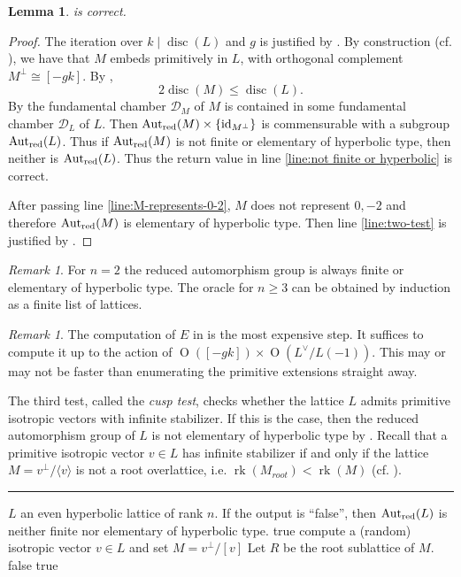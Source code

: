 \documentclass[11pt,letterpaper]{amsart}
\DeclareMathOperator{\rk}{rk}
\DeclareMathOperator{\Aut}{Aut}
\DeclareMathOperator{\id}{id}
\DeclareMathOperator{\disc}{disc}
\DeclareMathOperator{\Or}{O}
\newcommand{\AutredL}{\Aut_{\rm red}(L)}
\newcommand{\AutredM}{\Aut_{\rm red}(M)}
\newcommand{\D}{\mathcal{D}}
\newtheorem{lemma}[theorem]{Lemma}
\theoremstyle{definition}
\theoremstyle{remark}
\newtheorem{remark}[theorem]{Remark}
\begin{document}
\begin{lemma}
 is correct.
\end{lemma}
\begin{proof}
The iteration over $k \mid \disc(L)$ and $g$ is justified by .
By construction (cf. ), we have that $M$ embeds primitively in $L$, with orthogonal complement $M^\perp \cong [-gk]$. By  
,
\[2 \disc(M) \leq \disc(L).\]
By  the fundamental chamber $\D_M$ of $M$ is contained in some fundamental chamber $\D_L$ of $L$. Then $\AutredM\times \{\id_{M^\perp}\}$ is commensurable with a subgroup $\AutredL$. Thus if $\AutredM$ is not finite or elementary of hyperbolic type, then neither is $\AutredL$.
Thus the return value in line \ref{line:not finite or hyperbolic} is correct. 

After passing line \ref{line:M-represents-0-2}, $M$ does not represent $0,-2$ and therefore $\AutredM$ is elementary of hyperbolic type. Then line \ref{line:two-test} is justified by .
\end{proof}

\begin{remark}\label{rmk:oracle}
For $n=2$ the reduced automorphism group is always finite or elementary of hyperbolic type. 
The oracle for $n\ge 3$ can be obtained by induction as a finite list of lattices. 
\end{remark}
\begin{remark}
The computation of $E$ in  is the most expensive step. It suffices to compute it up to the action of $\Or([-gk])\times \Or(L^\vee/L(-1))$. This may or may not be faster than enumerating the primitive extensions straight away. 
\end{remark}

The third test, called the \emph{cusp test}, checks whether the lattice $L$ admits primitive isotropic vectors with infinite stabilizer. If this is the case, then the reduced automorphism group of $L$ is not elementary of hyperbolic type by . Recall that a primitive isotropic vector $v\in L$ has infinite stabilizer if and only if the lattice $M=v^\perp/\langle v \rangle$ is not a root overlattice, i.e. $\rk(M_{root}) < \rk(M)$ (cf. \cite[Proposition~3.2]{brandhorst.mezzedimi}). 

\begingroup
{}\label{alg:cusp test}
\endgroup
\hrule
\begin{algorithmic}[1]
\REQUIRE $L$ an even hyperbolic lattice of rank $n$.
\ENSURE If the output is ``false'', then $\AutredL$ is neither finite nor elementary of hyperbolic type.
\RETURN true
\ENDIF
\STATE compute a (random) isotropic vector $v \in L$ and set $M=v^\perp/[v]$
\STATE Let $R$ be the root sublattice of $M$.
\IF{$\rk R < n -2$}
\RETURN false 
\ENDIF 
\RETURN true
\end{algorithmic}\hrulefill\\
\end{document}
